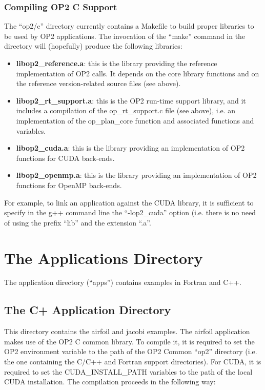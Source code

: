 \documentclass[a4paper]{article}
\begin{document}
\subsubsection{Compiling OP2 C Support}

The ``op2/c'' directory currently contains a Makefile to build proper
libraries to be used by OP2 applications. The invocation of the
``make'' command in the directory will (hopefully) produce the
following libraries:

\begin{itemize}

\item {\bf libop2\_reference.a}: this is the library providing the
  reference implementation of OP2 calls. It depends on the core library
  functions and on the reference version-related source files (see
  above).

\item {\bf libop2\_rt\_support.a}: this is the OP2 run-time support
  library, and it includes a compilation of the op\_rt\_support.c file
  (see above), i.e. an implementation of the op\_plan\_core function
  and associated functions and variables.

\item {\bf libop2\_cuda.a}: this is the library providing an
  implementation of OP2 functions for CUDA back-ends.

\item {\bf libop2\_openmp.a}: this is the library providing an
  implementation of OP2 functions for OpenMP back-ends.

\end{itemize}

For example, to link an application against the CUDA library, it is sufficient to
specify in the g++ command line the ``-lop2\_cuda''  option (i.e.
there is no need of using the prefix ``lib'' and the extension ``.a''.

\section{The Applications Directory}

The application directory (``apps'') contains examples in Fortran and C++.

\subsection{The C+ Application Directory}
This directory contains the airfoil and jacobi examples. The airfoil
application makes use of the OP2 C common library. To compile it, it
is required to set the OP2 environment variable to the path of the OP2
Common ``op2'' directory (i.e. the one containing the C/C++ and
Fortran support directories). For CUDA, it is required to set the
CUDA\_INSTALL\_PATH variables to the path of the local CUDA
installation. The compilation proceeds in the following
way:
\end{document}
